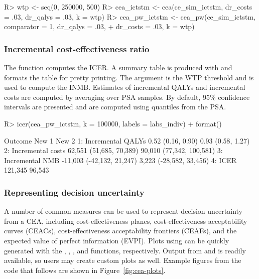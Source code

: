 \documentclass[article, nojss]{jss}\usepackage[]{graphicx}\usepackage[]{color}
\begin{document}
\begin{Schunk}
\begin{Sinput}
R> wtp <- seq(0, 250000, 500) 
R> cea_ictstm <- cea(ce_sim_ictstm, dr_costs = .03, dr_qalys = .03, k = wtp)
R> cea_pw_ictstm <- cea_pw(ce_sim_ictstm, comparator = 1, dr_qalys = .03, 
+    dr_costs = .03, k = wtp)
\end{Sinput}
\end{Schunk}

\subsubsection{Incremental cost-effectiveness ratio}
The  function computes the ICER. A summary table is produced with  and  formats the table for pretty printing. The argument  is the WTP threshold and is used to compute the INMB. Estimates of incremental QALYs and incremental costs are computed by averaging over PSA samples. By default, 95\% confidence intervals are presented and are computed using quantiles from the PSA.

\begin{Schunk}
\begin{Sinput}
R> icer(cea_pw_ictstm, k = 100000, labels = labs_indiv) %
+    format()
\end{Sinput}
\begin{Soutput}
             Outcome                     New 1                    New 2
1: Incremental QALYs         0.52 (0.16, 0.90)        0.93 (0.58, 1.27)
2: Incremental costs   62,551 (51,685, 70,389) 90,010 (77,342, 100,581)
3:   Incremental NMB -11,003 (-42,132, 21,247)  3,223 (-28,582, 33,456)
4:              ICER                   121,345                   96,543
\end{Soutput}
\end{Schunk}

\subsubsection{Representing decision uncertainty}
A number of common measures can be used to represent decision uncertainty from a CEA, including cost-effectiveness planes, cost-effectiveness acceptability curves (CEACs), cost-effectiveness acceptability frontiers (CEAFs), and the expected value of perfect information (EVPI). Plots using  can be quickly generated with the , , , and  functions, respectively. Output from  and  is readily available, so users may create custom plots as well. Example figures from the code that follows are shown in Figure~\ref{fig:cea-plots}.
\end{document}
